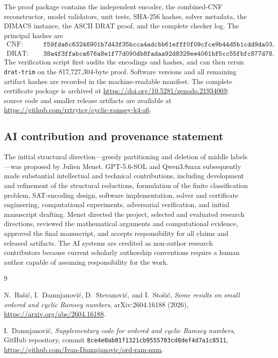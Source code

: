 \documentclass[11pt]{article}
\begin{document}
The proof package contains the independent encoder, the combined-CNF
reconstructor, model validators, unit tests, SHA-256 hashes, solver metadata,
the DIMACS instance, the ASCII DRAT proof, and the complete checker log.  The
principal hashes are
\begin{align*}
\text{CNF: }&\quad
\texttt{f59fda6c63246901b7d43f35bcca4adcbb61efff0f09cfce9b44d5b1cdd9da03},\\
\text{DRAT: }&\quad
\texttt{38a4f3ffabca676a8e1f77d090db8fadaa92d8328ee4061bf5cc55fbfc877d78}.
\end{align*}
The verification script first audits the encodings and hashes, and can then
rerun \texttt{drat-trim} on the 817,727,304-byte proof.  Software versions and
all remaining artifact hashes are recorded in the machine-readable manifest.
The complete certificate package is archived at
\url{https://doi.org/10.5281/zenodo.21934069}; source code and smaller release
artifacts are available at
\url{https://github.com/rrtrytcg/cyclic-ramsey-k4-a6}.

\subsection*{AI contribution and provenance statement}

The initial structural direction---greedy partitioning and deletion of middle
labels---was proposed by Julien Menet.  GPT-5.6-SOL and Qwen3.8max subsequently
made substantial intellectual and technical contributions, including
development and refinement of the structural reductions, formulation of the
finite classification problem, SAT-encoding design, software implementation,
solver and certificate engineering, computational experiments, adversarial
verification, and initial manuscript drafting.  Menet directed the project,
selected and evaluated research directions, reviewed the mathematical
arguments and computational evidence, approved the final manuscript, and
accepts responsibility for all claims and released artifacts.  The AI systems
are credited as non-author research contributors because current scholarly
authorship conventions require a human author capable of assuming
responsibility for the work.

\begin{thebibliography}{9}

N.~Ba\v{s}i\'c, I.~Damnjanovi\'c, D.~Stevanovi\'c, and I.~Sto\v{s}i\'c,
\newblock \emph{Some results on small ordered and cyclic Ramsey numbers},
\newblock arXiv:2604.16188 (2026),
\newblock \url{https://arxiv.org/abs/2604.16188}.

I.~Damnjanovi\'c,
\newblock \emph{Supplementary code for ordered and cyclic Ramsey numbers},
\newblock GitHub repository, commit
\texttt{8ce4e0ab01f1321cb9555703cd8def4d7a1c8511},
\newblock \url{https://github.com/Ivan-Damnjanovic/ord-ram-num}.

\end{thebibliography}
\end{document}
